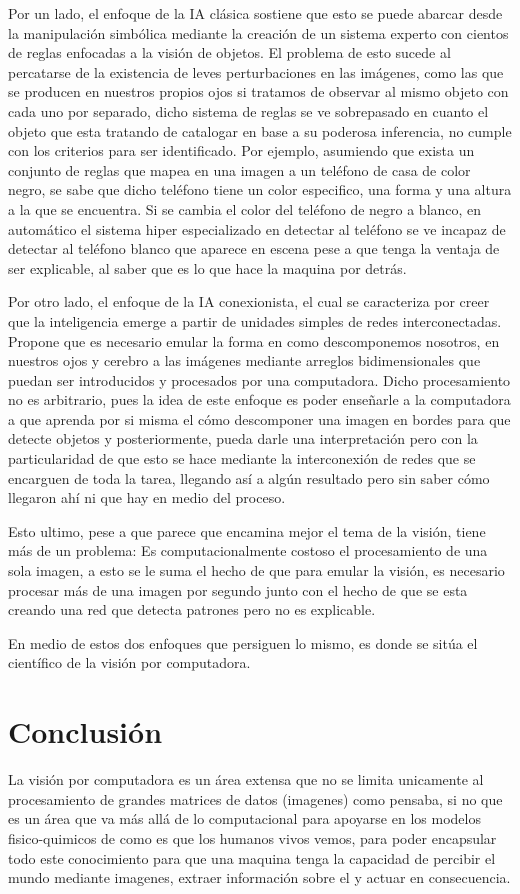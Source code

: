 \documentclass[11pt, letterpaper]{article}
\begin{document}
Por un lado, el enfoque de la IA clásica sostiene que esto se puede abarcar desde la manipulación simbólica mediante la creación de un sistema experto con cientos de reglas enfocadas a la visión de objetos. El problema de esto sucede al percatarse de la existencia de leves perturbaciones en las imágenes, como las que se producen en nuestros propios ojos si tratamos de observar al mismo objeto con cada uno por separado, dicho sistema de reglas se ve sobrepasado en cuanto el objeto que esta tratando de catalogar en base a su poderosa inferencia, no cumple con los criterios para ser identificado. Por ejemplo, asumiendo que exista un conjunto de reglas que mapea en una imagen a un teléfono de casa de color negro, se sabe que dicho teléfono tiene un color especifico, una forma y una altura a la que se encuentra. Si se cambia el color del teléfono de negro a blanco, en automático el sistema hiper especializado en detectar al teléfono se ve incapaz de detectar al teléfono blanco que aparece en escena pese a que tenga la ventaja de ser explicable, al saber que es lo que hace la maquina por detrás.

Por otro lado, el enfoque de la IA conexionista, el cual se caracteriza por creer que la inteligencia emerge a partir de unidades simples de redes interconectadas. Propone que es necesario emular la forma en como descomponemos nosotros, en nuestros ojos y cerebro a las imágenes mediante arreglos bidimensionales que puedan ser introducidos y procesados por una computadora. Dicho procesamiento no es arbitrario, pues la idea de este enfoque es poder enseñarle a la computadora a que aprenda por si misma el cómo descomponer una imagen en bordes para que detecte objetos y posteriormente, pueda darle una interpretación pero con la particularidad de que esto se hace mediante la interconexión de redes que se encarguen de toda la tarea, llegando así a algún resultado pero sin saber cómo llegaron ahí ni que hay en medio del proceso.

Esto ultimo, pese a que parece que encamina mejor el tema de la visión, tiene más de un problema: Es computacionalmente costoso el procesamiento de una sola imagen, a esto se le suma el hecho de que para emular la visión, es necesario procesar más de una imagen por segundo junto con el hecho de que se esta creando una red que detecta patrones pero no es explicable.

En medio de estos dos enfoques que persiguen lo mismo, es donde se sitúa el científico de la visión por computadora.

\section{Conclusión}

La visión por computadora es un área extensa que no se limita unicamente al procesamiento de grandes matrices de datos (imagenes) como pensaba, si no que es un área que va más allá de lo computacional para apoyarse en los modelos fisico-quimicos de como es que los humanos vivos vemos, para poder encapsular todo este conocimiento para que una maquina tenga la capacidad de percibir el mundo mediante imagenes, extraer información sobre el y actuar en consecuencia.




\end{document}
